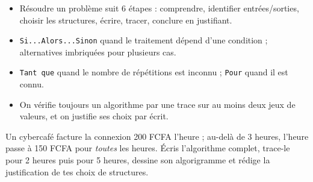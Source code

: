 \documentclass[11pt]{article}
\begin{document}
\begin{aretenir}[L'essentiel]
\begin{itemize}
\item Résoudre un problème suit 6 étapes : comprendre, identifier entrées/sorties, choisir les structures, écrire, tracer, conclure en justifiant.
\item \texttt{Si...Alors...Sinon} quand le traitement dépend d'une condition ; alternatives imbriquées pour plusieurs cas.
\item \texttt{Tant que} quand le nombre de répétitions est inconnu ; \texttt{Pour} quand il est connu.
\item On vérifie toujours un algorithme par une trace sur au moins deux jeux de valeurs, et on justifie ses choix par écrit.
\end{itemize}
\end{aretenir}

\begin{exercice}
Un cybercafé facture la connexion 200 FCFA l'heure ; au-delà de 3 heures, l'heure passe à 150 FCFA pour \emph{toutes} les heures. Écris l'algorithme complet, trace-le pour 2 heures puis pour 5 heures, dessine son algorigramme et rédige la justification de tes choix de structures.
\end{exercice}
\end{document}
